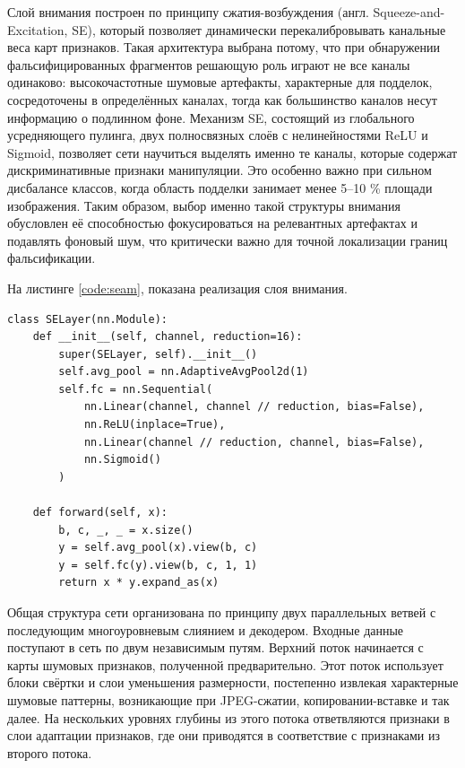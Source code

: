 Слой внимания построен по принципу сжатия-возбуждения (англ. Squeeze-and-Excitation, SE), который позволяет динамически перекалибровывать канальные веса карт признаков. Такая архитектура выбрана потому, что при обнаружении фальсифицированных фрагментов решающую роль играют не все каналы одинаково: высокочастотные шумовые артефакты, характерные для подделок, сосредоточены в определённых каналах, тогда как большинство каналов несут информацию о подлинном фоне. Механизм SE, состоящий из глобального усредняющего пулинга, двух полносвязных слоёв с нелинейностями ReLU и Sigmoid, позволяет сети научиться выделять именно те каналы, которые содержат дискриминативные признаки манипуляции. Это особенно важно при сильном дисбалансе классов, когда область подделки занимает менее 5–10 \% площади изображения. Таким образом, выбор именно такой структуры внимания обусловлен её способностью фокусироваться на релевантных артефактах и подавлять фоновый шум, что критически важно для точной локализации границ фальсификации.

На листинге \ref{code:seam}, показана реализация слоя внимания.

\begin{lstlisting}[caption=Листинг 2.5 -- Реализация слоя внимания,label=code:seam]
	class SELayer(nn.Module):
    def __init__(self, channel, reduction=16):
        super(SELayer, self).__init__()
        self.avg_pool = nn.AdaptiveAvgPool2d(1)         
        self.fc = nn.Sequential(
            nn.Linear(channel, channel // reduction, bias=False),
            nn.ReLU(inplace=True),
            nn.Linear(channel // reduction, channel, bias=False),
            nn.Sigmoid()                                 
        )

    def forward(self, x):
        b, c, _, _ = x.size()
        y = self.avg_pool(x).view(b, c)                  
        y = self.fc(y).view(b, c, 1, 1)                  
        return x * y.expand_as(x)    
\end{lstlisting}

Общая структура сети организована по принципу двух параллельных ветвей с последующим многоуровневым слиянием и декодером. Входные данные поступают в сеть по двум независимым путям. Верхний поток начинается с карты шумовых признаков, полученной предварительно. Этот поток использует блоки свёртки и слои уменьшения размерности, постепенно извлекая характерные шумовые паттерны, возникающие при JPEG-сжатии, копировании-вставке и так далее. На нескольких уровнях глубины из этого потока ответвляются признаки в слои адаптации признаков, где они приводятся в соответствие с признаками из второго потока.

